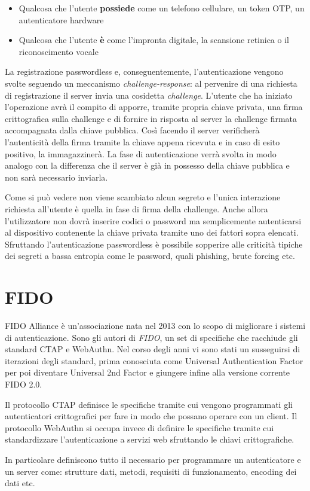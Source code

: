 \begin{itemize}
	\item Qualcosa che l'utente \textbf{possiede} come un telefono cellulare, un token OTP, un autenticatore hardware
	\item Qualcosa che l'utente \textbf{è} come l'impronta digitale, la scansione retinica o il riconoscimento vocale 
\end{itemize}

La registrazione passwordless e, conseguentemente, l'autenticazione vengono svolte seguendo un meccanismo \emph{challenge-response}: al pervenire di una richiesta di registrazione il server invia una cosidetta \emph{challenge}. L'utente che ha iniziato l'operazione avrà il compito di apporre, tramite propria chiave privata, una firma crittografica sulla challenge e di fornire in risposta al server la challenge firmata accompagnata dalla chiave pubblica. Così facendo il server verificherà l'autenticità della firma tramite la chiave appena ricevuta e in caso di esito positivo, la immagazzinerà. La fase di autenticazione verrà svolta in modo analogo con la differenza che il server è già in possesso della chiave pubblica e non sarà necessario inviarla.

Come si può vedere non viene scambiato alcun segreto e l'unica interazione richiesta all'utente è quella in fase di firma della challenge. Anche allora l'utilizzatore non dovrà inserire codici o password ma semplicemente autenticarsi al dispositivo contenente la chiave privata tramite uno dei fattori sopra elencati. Sfruttando l'autenticazione passwordless è possibile sopperire alle criticità tipiche dei segreti a bassa entropia come le password, quali phishing, brute forcing etc. 

\section{FIDO}
\label{fido}

FIDO Alliance è un'associazione nata nel 2013 con lo scopo di migliorare i sistemi di autenticazione. Sono gli autori di \emph{FIDO}, un set di specifiche che racchiude gli standard CTAP e WebAuthn. Nel corso degli anni vi sono stati un susseguirsi di iterazioni degli standard, prima conosciuta come Universal Authentication Factor per poi diventare Universal 2nd Factor e giungere infine alla versione corrente FIDO 2.0. 

Il protocollo CTAP definisce le specifiche tramite cui vengono programmati gli autenticatori crittografici per fare in modo che possano operare con un client. Il protocollo WebAuthn si occupa invece di definire le specifiche tramite cui standardizzare l'autenticazione a servizi web sfruttando le chiavi crittografiche. 

In particolare definiscono tutto il necessario per programmare un autenticatore e un server come: strutture dati, metodi, requisiti di funzionamento, encoding dei dati etc.